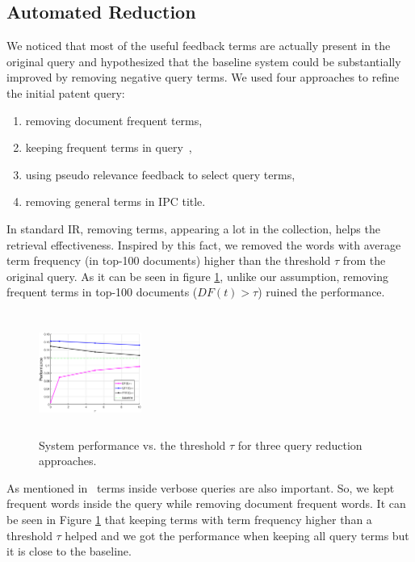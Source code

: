 \subsection{Automated Reduction}
We noticed that most of the useful feedback terms are actually present in the original query and hypothesized that the baseline system could be substantially improved by removing negative query terms. We used four approaches to refine the initial patent query: 
\begin{enumerate}
  \item removing document frequent terms,
  \item keeping frequent terms in query~\cite{maxwell2013compact},
  \item using pseudo relevance feedback to select query terms, 
  \item removing general terms in IPC title. 
\end{enumerate}

In standard IR, removing terms, appearing a lot in the collection, helps the retrieval effectiveness. Inspired by this fact, we removed the words with average term frequency (in top-100 documents) higher than the threshold $\tau$ from the original query. As it can be seen in figure \ref{fig:queryreduc}, unlike our assumption, removing frequent terms in top-100 documents ($DF(t)>\tau$) ruined the performance.     
\begin{figure}[htpb]
   \centering
   \includegraphics[width=0.30\textwidth,height=40mm]{figs/queryreduc.eps}
   \caption{System performance vs. the threshold $\tau$ for three query reduction approaches.}   
   \label{fig:queryreduc} 
\end{figure}

As mentioned in~\cite{maxwell2013compact} terms inside verbose queries are also important. So, we kept frequent words inside the query while removing document frequent words. It can be seen in Figure \ref{fig:queryreduc} that keeping terms with term frequency higher than a threshold $\tau$ helped and we got the performance when keeping all query terms but it is close to the baseline. 

